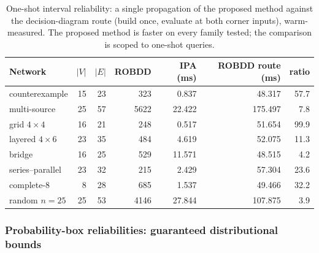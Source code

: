 \documentclass[preprint,12pt]{elsarticle}
\theoremstyle{definition}
\begin{document}
\begin{table}[t]
\centering\small
\caption{One-shot interval reliability: a single propagation of the proposed method against the
decision-diagram route (build once, evaluate at both corner inputs), warm-measured. The proposed method
is faster on every family tested; the comparison is scoped to one-shot queries.}
\label{tab:interval_timing}
\begin{tabular}{lrrrrrr}
\toprule
Network & $|V|$ & $|E|$ & ROBDD & IPA (ms) & ROBDD route (ms) & ratio\\
\midrule
counterexample   & 15 & 23 &  323 &  0.837 &  48.317 & 57.7\\
multi-source     & 25 & 57 & 5622 & 22.422 & 175.497 &  7.8\\
grid $4{\times}4$& 16 & 21 &  248 &  0.517 &  51.654 & 99.9\\
layered $4{\times}6$ & 23 & 35 & 484 & 4.619 & 52.075 & 11.3\\
bridge           & 16 & 25 &  529 & 11.571 &  48.515 &  4.2\\
series--parallel & 23 & 32 &  215 &  2.429 &  57.304 & 23.6\\
complete-8       &  8 & 28 &  685 &  1.537 &  49.466 & 32.2\\
random $n{=}25$  & 25 & 53 & 4146 & 27.844 & 107.875 &  3.9\\
\bottomrule
\end{tabular}
\end{table}

\subsubsection{Probability-box reliabilities: guaranteed distributional bounds}\label{sec:pbox}
\end{document}
